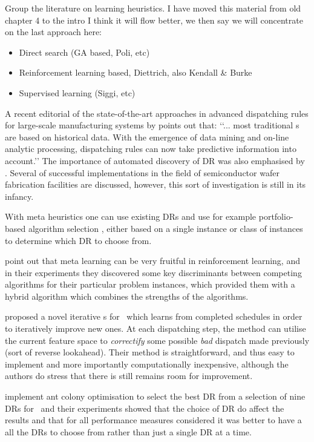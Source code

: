 \documentclass[smallextended]{svjour3}
\begin{document}
Group the literature on learning heuristics. I have moved this material from old chapter 4 to the intro I think it will flow better, we then say we will concentrate on the last approach here:
\begin{itemize}
\item Direct search (GA based, Poli, etc)
\item Reinforcement learning based, Diettrich, also Kendall \& Burke
\item Supervised learning (Siggi, etc)
\end{itemize}


A recent editorial of the state-of-the-art approaches in advanced dispatching 
rules for large-scale manufacturing systems by \cite{Chen13} points out that:
\lq\lq ... most traditional \dr s are based on historical data. 
With the emergence of data mining and on-line analytic processing, dispatching 
rules can now take predictive information into account.\rq\rq 
The importance of automated discovery of DR was also emphasised by 
\cite{Monch13}. 
Several of successful implementations in the field of semiconductor wafer 
fabrication facilities are discussed, however, this sort of investigation is 
still in its infancy.

With meta heuristics one can use existing DRs and use for example 
portfolio-based algorithm selection \cite{Rice76,Gomes01}, either based on a 
single instance or class of instances \cite{Xu07} to determine which DR to 
choose from. 

\cite{Kalyanakrishnan11} point out that meta learning can be very fruitful in 
reinforcement learning, and in their experiments they discovered some key 
discriminants between competing algorithms for their particular problem 
instances, which provided them with a hybrid algorithm which combines the 
strengths of the algorithms.

\cite{Nguyen13} proposed a novel iterative \dr s for \JSP\ which learns from 
completed schedules in order to iteratively improve new ones. 
At each dispatching step, the method can utilise the current feature space to 
\emph{correctify} some possible \emph{bad} dispatch made previously (sort of 
reverse lookahead).  Their method is straightforward, and thus easy to 
implement and more importantly computationally inexpensive, although the 
authors do stress that there is still remains room for improvement.

\cite{Korytkowski13} implement ant colony optimisation to select the best DR 
from a selection of nine DRs for \JSP\ and their experiments showed that the 
choice of DR do affect the results and that for all performance measures 
considered it was better to have a all the DRs to choose from rather than just 
a single DR at a time. 	
\end{document}
